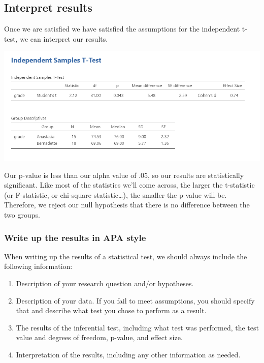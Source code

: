 \documentclass[
]{book}
\providecommand{\tightlist}{%
  \setlength{\itemsep}{0pt}\setlength{\parskip}{0pt}}
\begin{document}
\hypertarget{interpret-results-1}{%
\subsection{Interpret results}\label{interpret-results-1}}

Once we are satisfied we have satisfied the assumptions for the independent t-test, we can interpret our results.

\includegraphics{images/02-independent_t-test/independent_t-test_ind-results.png}

Our p-value is less than our alpha value of .05, so our results are statistically significant. Like most of the statistics we'll come across, the larger the t-statistic (or F-statistic, or chi-square statistic\ldots), the smaller the p-value will be. Therefore, we reject our null hypothesis that there is no difference between the two groups.

\hypertarget{write-up-the-results-in-apa-style-1}{%
\subsubsection{Write up the results in APA style}\label{write-up-the-results-in-apa-style-1}}

When writing up the results of a statistical test, we should always include the following information:

\begin{enumerate}
\def\labelenumi{\arabic{enumi}.}
\tightlist
\item
  Description of your research question and/or hypotheses.
\item
  Description of your data. If you fail to meet assumptions, you should specify that and describe what test you chose to perform as a result.
\item
  The results of the inferential test, including what test was performed, the test value and degrees of freedom, p-value, and effect size.
\item
  Interpretation of the results, including any other information as needed.
\end{enumerate}
\end{document}
